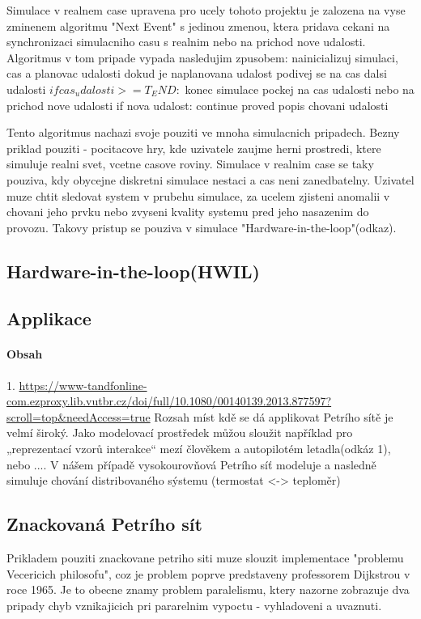 Simulace v realnem case upravena pro ucely tohoto projektu je zalozena na vyse zminenem algoritmu "Next Event" s jedinou zmenou, ktera pridava cekani na synchronizaci simulacniho casu s realnim nebo na prichod nove udalosti. Algoritmus v tom pripade vypada nasledujim zpusobem:
nainicializuj simulaci, cas a planovac udalosti
dokud je naplanovana udalost
  podivej se na cas dalsi udalosti 
  $if cas_udalosti >= T_END:$
    konec simulace
  pockej na cas udalosti nebo na prichod nove udalosti
  if nova udalost:
    continue
  proved popis chovani udalosti

Tento algoritmus nachazi svoje pouziti ve mnoha simulacnich pripadech. Bezny priklad pouziti - pocitacove hry, kde uzivatele zaujme herni prostredi, ktere simuluje realni svet, vcetne casove roviny. Simulace v realnim case se taky pouziva, kdy obycejne diskretni simulace nestaci a cas neni zanedbatelny. Uzivatel muze chtit sledovat system v prubehu simulace, za ucelem zjisteni anomalii v chovani jeho prvku nebo zvyseni kvality systemu pred jeho nasazenim do provozu. Takovy pristup se pouziva v simulace "Hardware-in-the-loop"(odkaz).
\subsection*{Hardware-in-the-loop(HWIL)}
\subsection*{Applikace}
\paragraph*{Obsah}

1. \url{https://www-tandfonline-com.ezproxy.lib.vutbr.cz/doi/full/10.1080/00140139.2013.877597?scroll=top&needAccess=true}
Rozsah míst kdě se dá applikovat Petrího sítě je velmí široký. Jako modelovací prostředek můžou sloužit například pro „reprezentací vzorů interakce“ mezí člověkem a autopilotém letadla(odkáz 1), nebo .... V nášem případě vysokourovňová Petrího síť modeluje a nasledně simuluje chování distribovaného sýstemu (termostat <-> teploměr) 

\subsection*{Znackovaná Petrího sít}
Prikladem pouziti znackovane petriho siti muze slouzit implementace "problemu Vecericich philosofu", coz je problem poprve predstaveny professorem Dijkstrou v roce 1965.
Je to obecne znamy problem paralelismu, ktery nazorne zobrazuje dva pripady chyb vznikajicich pri pararelnim vypoctu - vyhladoveni a uvaznuti.
